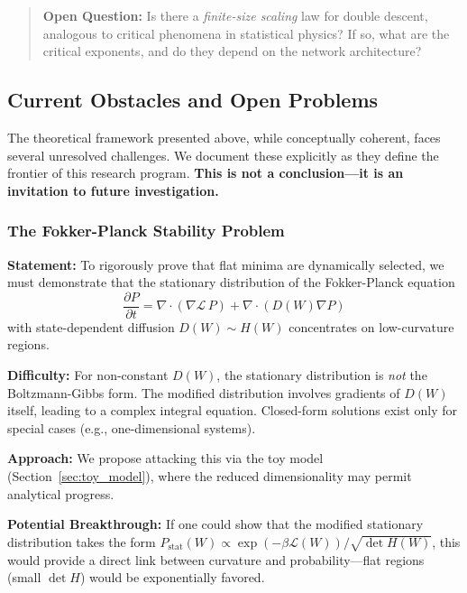 \documentclass[
  journal=largetwo,
  year=2025,
  volume=37,
]{cup-journal}
\begin{document}
\begin{quote}
\textbf{Open Question:} Is there a \textit{finite-size scaling} law for double descent, analogous to critical phenomena in statistical physics? If so, what are the critical exponents, and do they depend on the network architecture?
\end{quote}

\subsection{Current Obstacles and Open Problems}\label{sec:open_problems}

The theoretical framework presented above, while conceptually coherent, faces several unresolved challenges. We document these explicitly as they define the frontier of this research program. \textbf{This is not a conclusion---it is an invitation to future investigation.}

\subsubsection{The Fokker-Planck Stability Problem}

\textbf{Statement:} To rigorously prove that flat minima are dynamically selected, we must demonstrate that the stationary distribution of the Fokker-Planck equation
\begin{equation}
    \frac{\partial P}{\partial t} = \nabla \cdot \left( \nabla \mathcal{L} \, P \right) + \nabla \cdot \left( D(W) \nabla P \right)
\end{equation}
with state-dependent diffusion $D(W) \sim H(W)$ concentrates on low-curvature regions.

\textbf{Difficulty:} For non-constant $D(W)$, the stationary distribution is \textit{not} the Boltzmann-Gibbs form. The modified distribution involves gradients of $D(W)$ itself, leading to a complex integral equation. Closed-form solutions exist only for special cases (e.g., one-dimensional systems).

\textbf{Approach:} We propose attacking this via the toy model (Section~\ref{sec:toy_model}), where the reduced dimensionality may permit analytical progress.

\textbf{Potential Breakthrough:} If one could show that the modified stationary distribution takes the form $P_{\text{stat}}(W) \propto \exp(-\beta \mathcal{L}(W)) / \sqrt{\det H(W)}$, this would provide a direct link between curvature and probability---flat regions (small $\det H$) would be exponentially favored.
\end{document}
